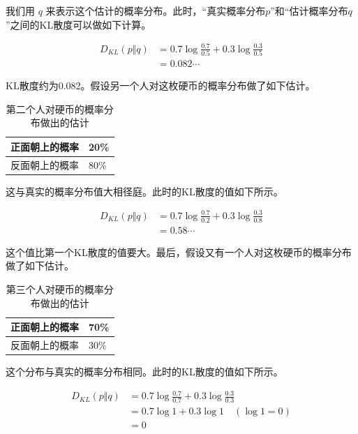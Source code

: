 \documentclass[lang=cn,newtx,10pt,scheme=chinese]{elegantbook}
\begin{document}
我们用 $q$ 来表示这个估计的概率分布。此时，``真实概率分布$p$''和``估计概率分布$q$''之间的KL散度可以做如下计算。

\begin{equation}
\begin{aligned}
D_{KL}(p\Vert q) &= 0.7\log\frac{0.7}{0.5}+0.3\log\frac{0.3}{0.5} \\
&= 0.082\cdots
\end{aligned}
\end{equation}

KL散度约为0.082。假设另一个人对这枚硬币的概率分布做了如下估计。

\begin{table}[!ht]
\centering
\begin{tabular}{|l|l|}
\hline
正面朝上的概率 & 20\% \\ \hline
反面朝上的概率 & 80\% \\ \hline
\end{tabular}
\caption{第二个人对硬币的概率分布做出的估计}\label{tbl:estimate-coin-2}
\end{table}

这与真实的概率分布值大相径庭。此时的KL散度的值如下所示。

\begin{equation}
\begin{aligned}
D_{KL}(p\Vert q) &= 0.7\log\frac{0.7}{0.2}+0.3\log\frac{0.3}{0.8} \\
&= 0.58\cdots
\end{aligned}
\end{equation}

这个值比第一个KL散度的值要大。最后，假设又有一个人对这枚硬币的概率分布做了如下估计。

\begin{table}[!ht]
\centering
\begin{tabular}{|l|l|}
\hline
正面朝上的概率 & 70\% \\ \hline
反面朝上的概率 & 30\% \\ \hline
\end{tabular}
\caption{第三个人对硬币的概率分布做出的估计}\label{tbl:estimate-coin-3}
\end{table}

这个分布与真实的概率分布相同。此时的KL散度的值如下所示。

\begin{equation}
\begin{aligned}
D_{KL}(p\Vert q) &= 0.7\log\frac{0.7}{0.7}+0.3\log\frac{0.3}{0.3} \\
&= 0.7\log 1+0.3\log 1\quad(\log 1 = 0) \\
&= 0
\end{aligned}
\end{equation}
\end{document}
